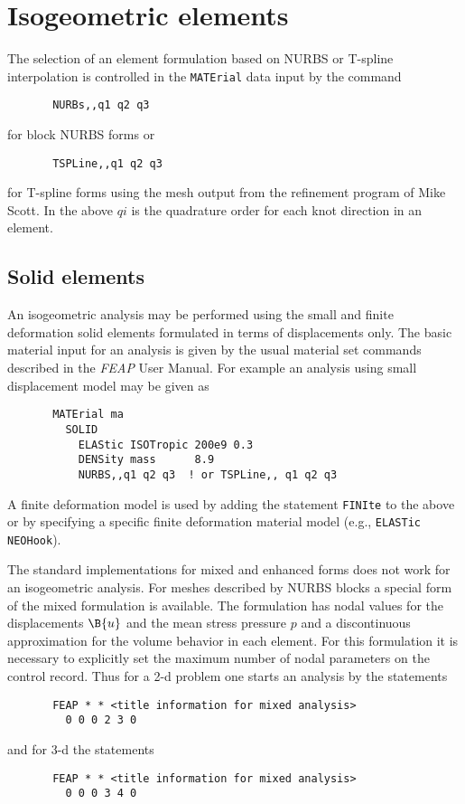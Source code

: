 \section{Isogeometric elements}

The selection of an element formulation based on NURBS or T-spline interpolation is controlled in the \texttt{MATErial} data input by the command
\begin{verbatim}
       NURBs,,q1 q2 q3
\end{verbatim}
for block NURBS forms or
\begin{verbatim}
       TSPLine,,q1 q2 q3
\end{verbatim}
for T-spline forms using the mesh output from the refinement program of Mike
Scott.  In the above $qi$ is the quadrature order for each knot direction in an
element.

\subsection{Solid elements}

An isogeometric analysis may be performed using the small and finite deformation
solid elements formulated in terms of displacements only.  The basic
material input for an analysis is given by the usual material set commands
described in the \textsl{FEAP} User Manual.  For example
an analysis using small displacement model may be given as  
\begin{verbatim}
       MATErial ma
         SOLID
           ELAStic ISOTropic 200e9 0.3
           DENSity mass      8.9
           NURBS,,q1 q2 q3  ! or TSPLine,, q1 q2 q3
\end{verbatim}
A finite deformation model is used by adding the statement \texttt{FINIte}
to the above or by specifying a specific finite deformation material model
(e.g., \texttt{ELASTic NEOHook}).

The standard implementations for mixed and enhanced forms does not work
for an isogeometric analysis.  For meshes described by NURBS blocks a
special form of the mixed formulation is available.  The formulation has
nodal values for the displacements $\B{u}$ and the mean stress pressure $p$
and a discontinuous approximation for the volume behavior in each element.
For this formulation it is necessary to explicitly set the maximum number of
nodal parameters on the control record.  Thus for a 2-d problem one starts
an analysis by the statements
\begin{verbatim}
       FEAP * * <title information for mixed analysis>
         0 0 0 2 3 0
\end{verbatim}
and for 3-d the statements
\begin{verbatim}
       FEAP * * <title information for mixed analysis>
         0 0 0 3 4 0
\end{verbatim}

